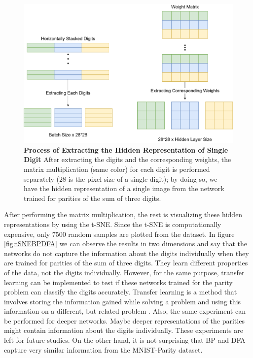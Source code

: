\documentclass[a4paper, nobind]{templates/ociamthesis}
\begin{document}
\begin{figure}

{\centering \includegraphics[width=1\linewidth]{figures/3_hidden_rep_process} 

}

\caption[Process of Extracting the Hidden Representation of Single Digit]{\textbf{Process of Extracting the Hidden Representation of Single Digit} \newline After extracting the digits and the corresponding weights, the matrix multiplication (same color) for each digit is performed separately ($28$ is the pixel size of a single digit); by doing so, we have the hidden representation of a single image from the network trained for parities of the sum of three digits.}\label{fig:HiddenRepProcess}
\end{figure}

\noindent After performing the matrix multiplication, the rest is visualizing these hidden representations by using the t-SNE. Since the t-SNE is computationally expensive, only 7500 random samples are plotted from the dataset. In figure \ref{fig:tSNEBPDFA} we can observe the results in two dimensions and say that the networks do not capture the information about the digits individually when they are trained for parities of the sum of three digits. They learn different properties of the data, not the digits individually. However, for the same purpose, transfer learning can be implemented to test if these networks trained for the parity problem can classify the digits accurately. Transfer learning is a method that involves storing the information gained while solving a problem and using this information on a different, but related problem \cite{DBLP:journals/corr/JhaS15}. Also, the same experiment can be performed for deeper networks. Maybe deeper representations of the parities might contain information about the digits individually. These experiments are left for future studies. On the other hand, it is not surprising that BP and DFA capture very similar information from the MNIST-Parity dataset.
\end{document}

